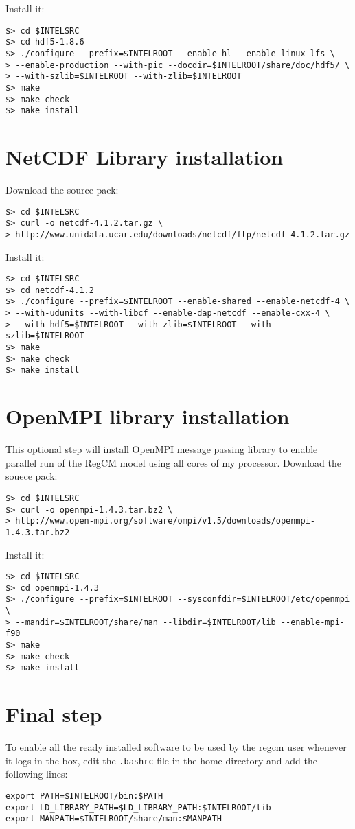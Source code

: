 Install it:

\begin{Verbatim}
$> cd $INTELSRC
$> cd hdf5-1.8.6
$> ./configure --prefix=$INTELROOT --enable-hl --enable-linux-lfs \
> --enable-production --with-pic --docdir=$INTELROOT/share/doc/hdf5/ \
> --with-szlib=$INTELROOT --with-zlib=$INTELROOT
$> make
$> make check
$> make install
\end{Verbatim}

\section{NetCDF Library installation}

Download the source pack:

\begin{Verbatim}
$> cd $INTELSRC
$> curl -o netcdf-4.1.2.tar.gz \
> http://www.unidata.ucar.edu/downloads/netcdf/ftp/netcdf-4.1.2.tar.gz
\end{Verbatim}

Install it:

\begin{Verbatim}
$> cd $INTELSRC
$> cd netcdf-4.1.2
$> ./configure --prefix=$INTELROOT --enable-shared --enable-netcdf-4 \
> --with-udunits --with-libcf --enable-dap-netcdf --enable-cxx-4 \
> --with-hdf5=$INTELROOT --with-zlib=$INTELROOT --with-szlib=$INTELROOT
$> make
$> make check
$> make install
\end{Verbatim}

\section{OpenMPI library installation}

This optional step will install OpenMPI message passing library to enable
parallel run of the RegCM model using all cores of my processor.
Download the souece pack:

\begin{Verbatim}
$> cd $INTELSRC
$> curl -o openmpi-1.4.3.tar.bz2 \
> http://www.open-mpi.org/software/ompi/v1.5/downloads/openmpi-1.4.3.tar.bz2
\end{Verbatim}

Install it:

\begin{Verbatim}
$> cd $INTELSRC
$> cd openmpi-1.4.3
$> ./configure --prefix=$INTELROOT --sysconfdir=$INTELROOT/etc/openmpi \
> --mandir=$INTELROOT/share/man --libdir=$INTELROOT/lib --enable-mpi-f90 
$> make
$> make check
$> make install
\end{Verbatim}

\section{Final step}

To enable all the ready installed software to be used by the regcm user whenever
it logs in the box, edit the \verb=.bashrc= file in the home directory and add
the following lines:

\begin{Verbatim}
export PATH=$INTELROOT/bin:$PATH
export LD_LIBRARY_PATH=$LD_LIBRARY_PATH:$INTELROOT/lib
export MANPATH=$INTELROOT/share/man:$MANPATH
\end{Verbatim}
